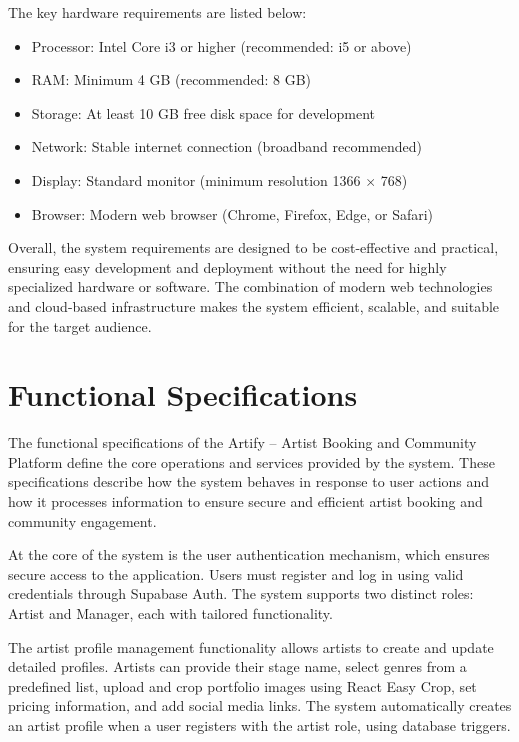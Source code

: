 \documentclass[12pt,a4paper]{report}
\begin{document}
The key hardware requirements are listed below:

\begin{itemize}
\item Processor: Intel Core i3 or higher (recommended: i5 or above)
\item RAM: Minimum 4 GB (recommended: 8 GB)
\item Storage: At least 10 GB free disk space for development
\item Network: Stable internet connection (broadband recommended)
\item Display: Standard monitor (minimum resolution 1366 $\times$ 768)
\item Browser: Modern web browser (Chrome, Firefox, Edge, or Safari)
\end{itemize}

Overall, the system requirements are designed to be cost-effective and practical, ensuring easy development and deployment without the need for highly specialized hardware or software. The combination of modern web technologies and cloud-based infrastructure makes the system efficient, scalable, and suitable for the target audience.

\section{Functional Specifications}

The functional specifications of the Artify -- Artist Booking and Community Platform define the core operations and services provided by the system. These specifications describe how the system behaves in response to user actions and how it processes information to ensure secure and efficient artist booking and community engagement.

At the core of the system is the user authentication mechanism, which ensures secure access to the application. Users must register and log in using valid credentials through Supabase Auth. The system supports two distinct roles: Artist and Manager, each with tailored functionality.

The artist profile management functionality allows artists to create and update detailed profiles. Artists can provide their stage name, select genres from a predefined list, upload and crop portfolio images using React Easy Crop, set pricing information, and add social media links. The system automatically creates an artist profile when a user registers with the artist role, using database triggers.
\end{document}
